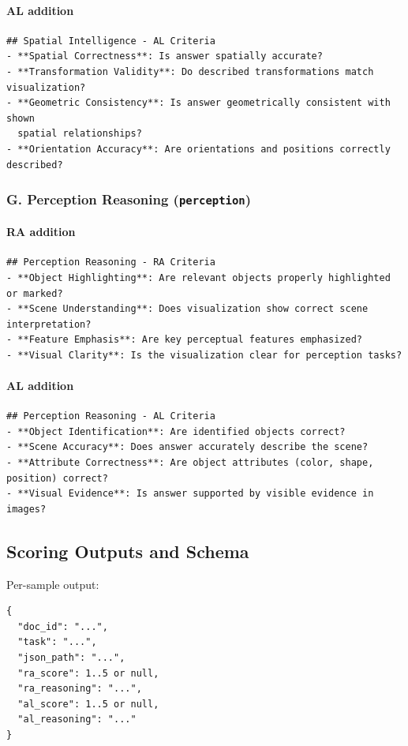 \documentclass{article}
\theoremstyle{plain}
\theoremstyle{definition}
\theoremstyle{remark}
\begin{document}
\paragraph{AL addition}
\begin{verbatim}
## Spatial Intelligence - AL Criteria
- **Spatial Correctness**: Is answer spatially accurate?
- **Transformation Validity**: Do described transformations match visualization?
- **Geometric Consistency**: Is answer geometrically consistent with shown
  spatial relationships?
- **Orientation Accuracy**: Are orientations and positions correctly described?
\end{verbatim}

\subsubsection*{G. Perception Reasoning (\texttt{perception})}
\paragraph{RA addition}
\begin{verbatim}
## Perception Reasoning - RA Criteria
- **Object Highlighting**: Are relevant objects properly highlighted or marked?
- **Scene Understanding**: Does visualization show correct scene interpretation?
- **Feature Emphasis**: Are key perceptual features emphasized?
- **Visual Clarity**: Is the visualization clear for perception tasks?
\end{verbatim}
\paragraph{AL addition}
\begin{verbatim}
## Perception Reasoning - AL Criteria
- **Object Identification**: Are identified objects correct?
- **Scene Accuracy**: Does answer accurately describe the scene?
- **Attribute Correctness**: Are object attributes (color, shape, position) correct?
- **Visual Evidence**: Is answer supported by visible evidence in images?
\end{verbatim}

\subsection{Scoring Outputs and Schema}
Per-sample output:
\begin{verbatim}
{
  "doc_id": "...",
  "task": "...",
  "json_path": "...",
  "ra_score": 1..5 or null,
  "ra_reasoning": "...",
  "al_score": 1..5 or null,
  "al_reasoning": "..."
}
\end{verbatim}
\end{document}
